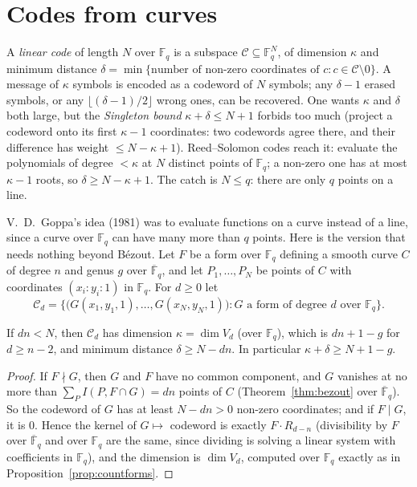 \section{Codes from curves}\label{sec:goppa}

A \emph{linear code} of length $N$ over $\mathbb F_q$ is a subspace $\mathcal C\subseteq\mathbb F_q^N$, of dimension $\kappa$ and minimum distance
$\delta=\min\{\text{number of non-zero coordinates of }c:c\in\mathcal C\setminus0\}$. A message of $\kappa$ symbols is encoded as a codeword of $N$ symbols;
any $\delta-1$ erased symbols, or any $\lfloor(\delta-1)/2\rfloor$ wrong ones, can be recovered. One wants $\kappa$ and $\delta$ both large, but the
\emph{Singleton bound} $\kappa+\delta\le N+1$ forbids too much (project a codeword onto its first $\kappa-1$ coordinates: two codewords agree there, and their
difference has weight $\le N-\kappa+1$). Reed--Solomon codes reach it: evaluate the polynomials of degree $<\kappa$ at $N$ distinct points of $\mathbb F_q$;
a non-zero one has at most $\kappa-1$ roots, so $\delta\ge N-\kappa+1$. The catch is $N\le q$: there are only $q$ points on a line.

V.~D.~Goppa's idea (1981) was to evaluate functions on a curve instead of a line, since a curve over $\mathbb F_q$ can have many more than $q$ points. Here is
the version that needs nothing beyond B\'ezout. Let $F$ be a form over $\mathbb F_q$ defining a smooth curve $C$ of degree $n$ and genus $g$ over
$\overline{\mathbb F}_q$, and let $P_1,\dots,P_N$ be points of $C$ with coordinates $(x_i:y_i:1)$ in $\mathbb F_q$. For $d\ge0$ let
\[
\mathcal C_d=\bigl\{\bigl(G(x_1,y_1,1),\dots,G(x_N,y_N,1)\bigr):G\text{ a form of degree }d\text{ over }\mathbb F_q\bigr\}.
\]

\begin{proposition}\label{prop:goppa}
If $dn<N$, then $\mathcal C_d$ has dimension $\kappa=\dim V_d$ (over $\mathbb F_q$), which is $dn+1-g$ for $d\ge n-2$, and minimum distance
$\delta\ge N-dn$. In particular $\kappa+\delta\ge N+1-g$.
\end{proposition}
\begin{proof}
If $F\nmid G$, then $G$ and $F$ have no common component, and $G$ vanishes at no more than $\sum_PI(P,F\cap G)=dn$ points of $C$ (Theorem~\ref{thm:bezout}
over $\overline{\mathbb F}_q$). So the codeword of $G$ has at least $N-dn>0$ non-zero coordinates; and if $F\mid G$, it is $0$. Hence the kernel of
$G\mapsto$ codeword is exactly $F\cdot R_{d-n}$ (divisibility by $F$ over $\overline{\mathbb F}_q$ and over $\mathbb F_q$ are the same, since dividing is
solving a linear system with coefficients in $\mathbb F_q$), and the dimension is $\dim V_d$, computed over $\mathbb F_q$ exactly as in
Proposition~\ref{prop:countforms}.
\end{proof}

